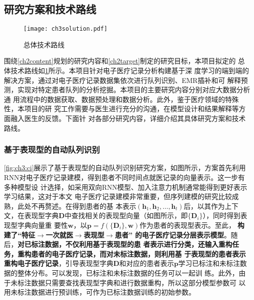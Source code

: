 \subsection{研究方案和技术路线}

\begin{figure}[h]
    \begin{small}
        \begin{center}
            \texttt{[image: ch3solution.pdf]}
        \end{center}
        \caption{总体技术路线}
        \label{fig:ch3:solution}
    \end{small}
\end{figure}

围绕\ref{ch2content}规划的研究内容和\ref{ch2target}制定的研究目标，本项目拟定的
总体技术路线如\cref{fig:ch3:solution}所示。本项目针对电子医疗记录分析构建基于深
度学习的端到端的解决方案，通过对电子医疗记录数据集依次进行队列识别、EMR插补和可
解释预测，实现对特定患者队列的分析挖掘。本项目的主要研究内容分别对应大数据分析通
用流程中的数据获取、数据预处理和数据分析。此外，鉴于医疗领域的特殊性，本项目的研
究工作需要与医生进行充分的沟通，在模型设计和结果解释等方面融入医生的反馈。下面针
对各部分研究内容，详细介绍其具体研究方案和技术路线。



\subsubsection{基于表现型的自动队列识别}\label{ch3_1}


\cref{fig:ch3:ci}展示了基于表现型的自动队列识别研究方案，如图所示，方案首先利用
RNN对电子医疗记录建模，得到患者不同时间点就医记录的向量表示。这一步有多种模型设
计选择，如采用双向RNN模型、加入注意力机制通常能得到更好表示学习结果，这对于本文
电子医疗记录建模非常重要，但序列建模的研究比较成熟，此处不再赘述。在得到患者的基
本表示$(\bm h_1, \bm h_2, \dots, \bm h_t)$后，以其作为上下文，在表现型字典$\bm
D$中查找相关的表现型向量（如图所示，即$\{\bm D_i\}$），同时得到表现型字典向量重
要性$\bm w$，以$\bm p = f(\{\bm D_i\}, \bm w)$作为患者的表现型表示。至此，
\textbf{构建了``特征$\rightarrow$一次就医$\rightarrow$表现型$\rightarrow$患者''
的电子医疗记录分层表示模型}。随后，\textbf{对已标注数据，不仅利用基于表现型的患
者表示进行分类，还输入重构任务，重构患者的电子医疗记录，而对未标注数据，则利用基
于表现型的患者表示重构电子医疗记录}，引导表现型字典$\bm D$和对应的患者表示$\bm
p$学习已标注和未标注数据的整体分布。可以发现，已标注和未标注数据的任务可以一起训
练。此外，由于未标注数据只需要查找表现型字典和进行数据重构，所以这部分模型参数可
以用未标注数据进行预训练，可作为已标注数据训练的初始参数。

